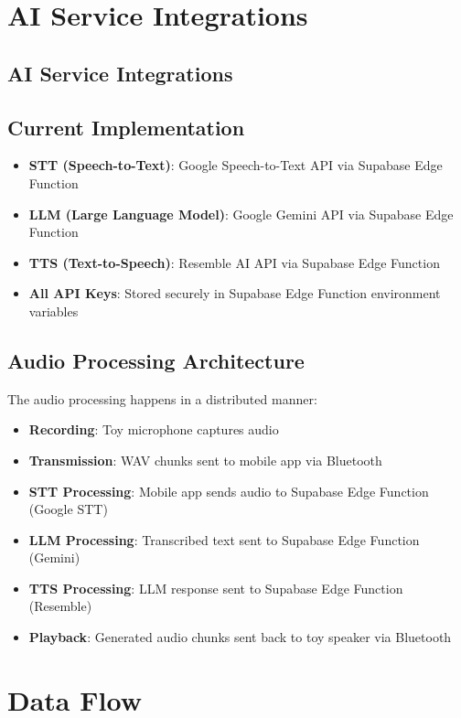 \documentclass[11pt,a4paper]{article}
\begin{document}
\section{AI Service Integrations}

\subsection{AI Service Integrations}

\subsection{Current Implementation}
\begin{itemize}
    \item \textbf{STT (Speech-to-Text)}: Google Speech-to-Text API via Supabase Edge Function
    \item \textbf{LLM (Large Language Model)}: Google Gemini API via Supabase Edge Function
    \item \textbf{TTS (Text-to-Speech)}: Resemble AI API via Supabase Edge Function
    \item \textbf{All API Keys}: Stored securely in Supabase Edge Function environment variables
\end{itemize}

\subsection{Audio Processing Architecture}
The audio processing happens in a distributed manner:
\begin{itemize}
    \item \textbf{Recording}: Toy microphone captures audio
    \item \textbf{Transmission}: WAV chunks sent to mobile app via Bluetooth
    \item \textbf{STT Processing}: Mobile app sends audio to Supabase Edge Function (Google STT)
    \item \textbf{LLM Processing}: Transcribed text sent to Supabase Edge Function (Gemini)
    \item \textbf{TTS Processing}: LLM response sent to Supabase Edge Function (Resemble)
    \item \textbf{Playback}: Generated audio chunks sent back to toy speaker via Bluetooth
\end{itemize}

\section{Data Flow}
\end{document}
